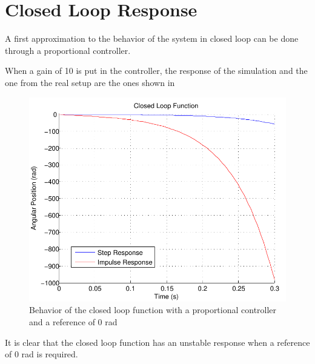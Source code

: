 \section{Closed Loop Response}\label{closedLoop}
A first approximation to the behavior of the system in closed loop can be done through a proportional controller.

When a gain of 10 is put in the controller, the response of the simulation and the one from the real setup are the ones shown in 

\begin{figure}[H] 
	\centering 
	\includegraphics[scale=0.6]{figures/closedLoopResponse}	
	\caption{Behavior of the closed loop function with a proportional controller and a reference of 0 rad}
	\label{closedLoopResponse}
\end{figure}

It is clear that the closed loop function has an unstable response when a reference of 0 rad is required.

